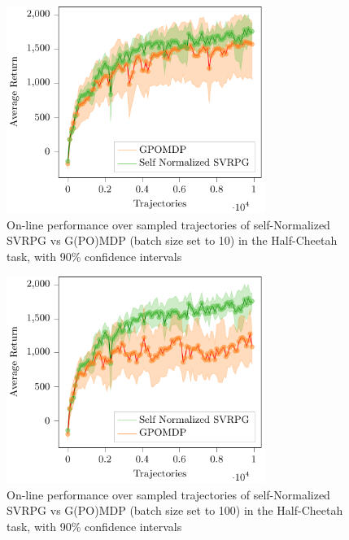 \begin{figure}[h]
	\vspace{1in}
	\begin{minipage}[h]{1\textwidth}
		\centering
		\includegraphics[width=0.75\textwidth]{Images/Experiments/half_cheetah_Self_Normalized_SVRPG_vs_GPOMDP.pdf}
		\vspace{-0.1in}
		\caption{On-line performance over sampled trajectories of self-Normalized \acs{SVRPG} vs G(PO)MDP (batch size set to 10) in the Half-Cheetah task, with 90\% confidence intervals}
		\label{fig:hcone}
	\end{minipage}
	\vspace{-0.15in}
\end{figure}

\begin{figure}[h]
	\begin{minipage}[h]{1\textwidth}
		\centering
		\includegraphics[width=0.75\textwidth]{Images/Experiments/half_cheetah_GPOMDP_100_vs_SN_SVRPG.pdf}
		\vspace{-0.1in}
		\caption{On-line performance over sampled trajectories of self-Normalized \acs{SVRPG} vs G(PO)MDP (batch size set to 100) in the Half-Cheetah task, with 90\% confidence intervals}
		\label{fig:hc100}
	\end{minipage}
	\vspace{-0.15in}
\end{figure}
\newpage


